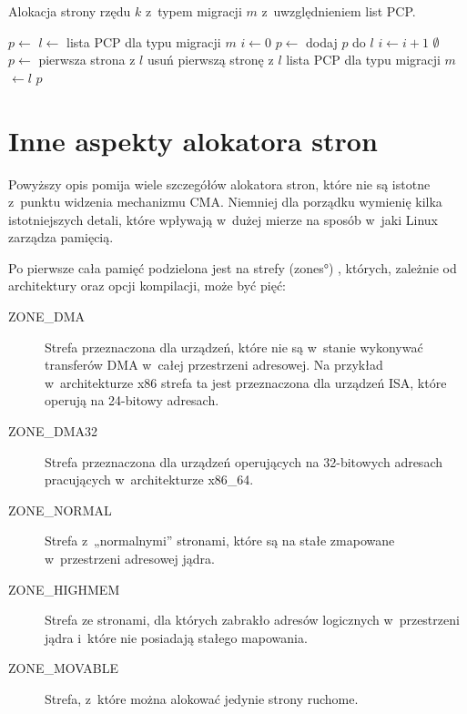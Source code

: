 \begin{algorithm}
\caption[Alokacja z~uwzględnieniem list PCP.]{Alokacja strony rzędu
  $k$ z~typem migracji $m$ z~uwzględnieniem list PCP.}
\label{alg:buddy-pcp}
\begin{algorithmic}[1]
        \State $p \gets$ 
    \Else
        \State $l \gets$ lista PCP dla typu migracji $m$
            \State $i \gets 0$
            \Repeat
                \State $p \gets$ 
                    \State dodaj $p$ do $l$
                    \State $i \gets i + 1$
                \EndIf
             
        \EndIf
            \State \Return $\emptyset$
        \Else
            \State $p \gets$ pierwsza strona z $l$
            \State usuń pierwszą stronę z $l$
            \State lista PCP dla typu migracji $m$ $\gets l$
        \EndIf
    \EndIf
    \State \Return $p$
\EndFunction
\end{algorithmic}
\end{algorithm}


\section{Inne aspekty alokatora stron}

Powyższy opis pomija wiele szczegółów alokatora stron, które nie są
istotne z~punktu widzenia mechanizmu CMA.  Niemniej dla porządku
wymienię kilka istotniejszych detali, które wpływają w~dużej mierze na
sposób w~jaki Linux zarządza pamięcią.

Po pierwsze cała pamięć podzielona jest na strefy (\ang{zones})
\autocite[podrozdział 8.1.3]{bib:utlk}, których, zależnie od
architektury oraz opcji kompilacji, może być pięć:

\begin{description}
\item[ZONE\_DMA] Strefa przeznaczona dla urządzeń, które nie są
  w~stanie wykonywać transferów DMA w~całej przestrzeni adresowej.  Na
  przykład w~architekturze x86 strefa ta jest przeznaczona dla
  urządzeń ISA, które operują na 24-bitowy adresach.
\item[ZONE\_DMA32] Strefa przeznaczona dla urządzeń operujących
  na 32-bitowych adresach pracujących w~architekturze x86\_64.
\item[ZONE\_NORMAL] Strefa z~„normalnymi” stronami, które są na
  stałe zmapowane w~przestrzeni adresowej jądra.
\item[ZONE\_HIGHMEM] Strefa ze stronami, dla których zabrakło
  adresów logicznych w~przestrzeni jądra i~które nie posiadają stałego
  mapowania.
\item[ZONE\_MOVABLE] Strefa, z~które można alokować jedynie
  strony ruchome.
\end{description}

